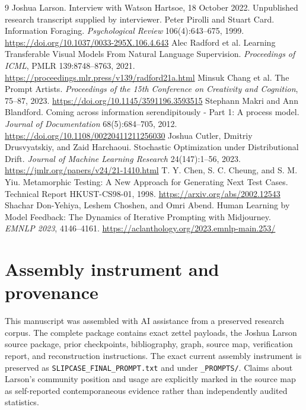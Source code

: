 \documentclass[11pt]{article}
\begin{document}
\begin{thebibliography}{9}
 Joshua Larson. Interview with Watson Hartsoe, 18 October 2022. Unpublished research transcript supplied by interviewer.
 Peter Pirolli and Stuart Card. Information Foraging. \emph{Psychological Review} 106(4):643--675, 1999. \url{https://doi.org/10.1037/0033-295X.106.4.643}
 Alec Radford et al. Learning Transferable Visual Models From Natural Language Supervision. \emph{Proceedings of ICML}, PMLR 139:8748--8763, 2021. \url{https://proceedings.mlr.press/v139/radford21a.html}
 Minsuk Chang et al. The Prompt Artists. \emph{Proceedings of the 15th Conference on Creativity and Cognition}, 75--87, 2023. \url{https://doi.org/10.1145/3591196.3593515}
 Stephann Makri and Ann Blandford. Coming across information serendipitously - Part 1: A process model. \emph{Journal of Documentation} 68(5):684--705, 2012. \url{https://doi.org/10.1108/00220411211256030}
 Joshua Cutler, Dmitriy Drusvyatskiy, and Zaid Harchaoui. Stochastic Optimization under Distributional Drift. \emph{Journal of Machine Learning Research} 24(147):1--56, 2023. \url{https://jmlr.org/papers/v24/21-1410.html}
 T. Y. Chen, S. C. Cheung, and S. M. Yiu. Metamorphic Testing: A New Approach for Generating Next Test Cases. Technical Report HKUST-CS98-01, 1998. \url{https://arxiv.org/abs/2002.12543}
 Shachar Don-Yehiya, Leshem Choshen, and Omri Abend. Human Learning by Model Feedback: The Dynamics of Iterative Prompting with Midjourney. \emph{EMNLP 2023}, 4146--4161. \url{https://aclanthology.org/2023.emnlp-main.253/}
\end{thebibliography}

\appendix
\section{Assembly instrument and provenance}
This manuscript was assembled with AI assistance from a preserved research corpus. The complete package contains exact zettel payloads, the Joshua Larson source package, prior checkpoints, bibliography, graph, source map, verification report, and reconstruction instructions. The exact current assembly instrument is preserved as \texttt{SLIPCASE\_FINAL\_PROMPT.txt} and under \texttt{\_PROMPTS/}. Claims about Larson's community position and usage are explicitly marked in the source map as self-reported contemporaneous evidence rather than independently audited statistics.
\end{document}
